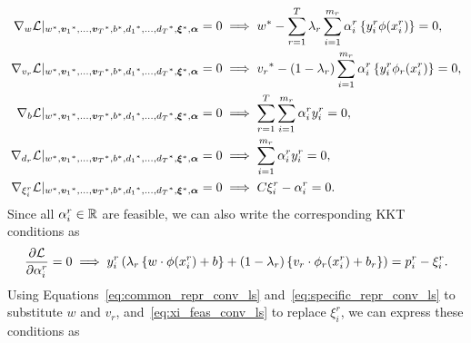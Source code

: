 \begin{align}
    \grad_{{w}} \lagr \vert_{\optim{{w}}, \optim{\fv{v}_1}, \ldots, \optim{\fv{v}_\ntasks}, \optim{b}, \optim{d_1}, \ldots, \optim{d_\ntasks}, \optim{\fv{\xi}}, {\fv{\alpha}}} = 0  &\implies \optim{{w}} - \sum_{r= 1}^\ntasks \lambda_r \sum_{i=1}^{m_r} {\alpha_i^r} \left\lbrace y_i^r \phi(x_i^r) \right\rbrace = 0 , \label{eq:common_repr_conv_ls} \\
    \grad_{{v}_r} \lagr \vert_{\optim{{w}}, \optim{\fv{v}_1}, \ldots, \optim{\fv{v}_\ntasks}, \optim{b}, \optim{d_1}, \ldots, \optim{d_\ntasks}, \optim{\fv{\xi}}, {\fv{\alpha}}} = 0 &\implies \optim{{v}_r} - (1 - \lambda_r) \sum_{i=1}^{m_r} {\alpha_i^r} \left\lbrace y_i^r \phi_r(x_i^r) \right\rbrace = 0 , \label{eq:specific_repr_conv_ls} \\
    \grad_{b} \lagr \vert_{\optim{{w}}, \optim{\fv{v}_1}, \ldots, \optim{\fv{v}_\ntasks}, \optim{b}, \optim{d_1}, \ldots, \optim{d_\ntasks}, \optim{\fv{\xi}}, {\fv{\alpha}}} = 0  &\implies \sum_{r= 1}^T \sum_{i=1}^{m_r} {\alpha_i^r} y_i^r = 0 , \label{eq:specific_eqconstr_conv_ls}  \\
    \grad_{{d}_r} \lagr \vert_{\optim{{w}}, \optim{\fv{v}_1}, \ldots, \optim{\fv{v}_\ntasks}, \optim{b}, \optim{d_1}, \ldots, \optim{d_\ntasks}, \optim{\fv{\xi}}, {\fv{\alpha}}} = 0 &\implies \sum_{i=1}^{m_r} {\alpha_i^r} y_i^r = 0 , \label{eq:common_eqconstr_conv_ls} \\
    \grad_{\xi_i^r} \lagr \vert_{\optim{{w}}, \optim{\fv{v}_1}, \ldots, \optim{\fv{v}_\ntasks}, \optim{b}, \optim{d_1}, \ldots, \optim{d_\ntasks}, \optim{\fv{\xi}}, {\fv{\alpha}}} = 0 &\implies C \xi_i^r - {\alpha_i^r} = 0 . \label{eq:xi_feas_conv_ls}
\end{align}
Since all $\alpha_i^r \in \mathbb{R}$ are feasible, we can also write the corresponding KKT conditions as
\begin{equation}
    \nonumber
    \frac{\partial \mathcal{L}}{\partial \alpha_i^r} = 0 \implies y_{i}^r \left(\lambda_r \left\lbrace {w} \cdot \phi(x_{i}^r) + b  \right\rbrace + (1 - \lambda_r) \left\lbrace {v}_r \cdot \phi_r(x_{i}^r) + b_r \right\rbrace  \right) = p_{i}^r - \xi_{i}^r  .
\end{equation}
Using Equations~\eqref{eq:common_repr_conv_ls} and~\eqref{eq:specific_repr_conv_ls} to substitute $w$ and $v_r$, and~\eqref{eq:xi_feas_conv_ls} to replace $\xi_i^r$, we can express these conditions as 
